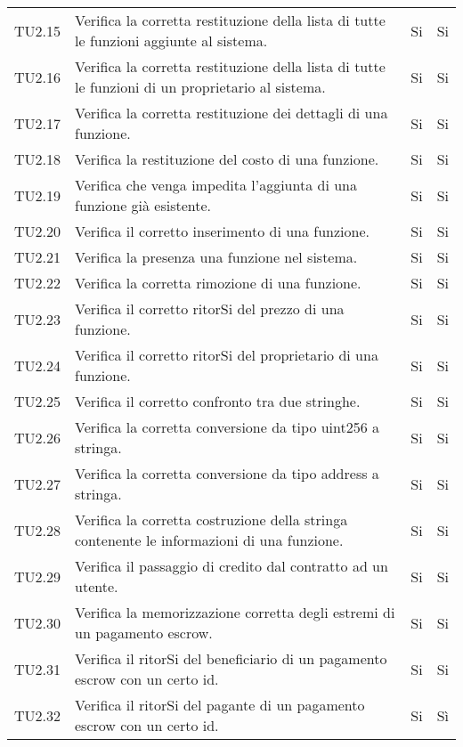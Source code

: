 \begin{longtable}{
		>{\centering}p{}
		>{}p{}
		>{\centering}p{}
		>{\centering}p{} }
TU2.15  &  Verifica la corretta restituzione della lista di tutte le funzioni aggiunte al sistema. &
Si & Si \tabularnewline

TU2.16  &  Verifica la corretta restituzione della lista di tutte le funzioni di un proprietario al sistema. &
Si & Si \tabularnewline

TU2.17  &  Verifica la corretta restituzione dei dettagli di una funzione. &
Si & Si \tabularnewline

TU2.18  &  Verifica la restituzione del costo di una funzione. &
Si & Si \tabularnewline

TU2.19  &  Verifica che venga impedita l'aggiunta di una funzione già esistente. &
Si & Si \tabularnewline

TU2.20  &  Verifica il corretto inserimento di una funzione. &%
Si & Si \tabularnewline

TU2.21  &  Verifica la presenza una funzione nel sistema.	&
Si & Si \tabularnewline

TU2.22  &  Verifica la corretta rimozione di una funzione. &
Si & Si \tabularnewline

TU2.23  &  Verifica il corretto ritorSi del prezzo di una funzione. &
Si & Si \tabularnewline

TU2.24  &  Verifica il corretto ritorSi del proprietario di una funzione. &
Si & Si \tabularnewline

TU2.25  &  Verifica il corretto confronto tra due stringhe. &
Si & Si \tabularnewline

TU2.26  &  Verifica la corretta conversione da tipo uint256 a stringa. &
Si & Si \tabularnewline

TU2.27  &  Verifica la corretta conversione da tipo address a stringa. &
Si & Si \tabularnewline

TU2.28  &  Verifica la corretta costruzione della stringa contenente le informazioni di una funzione. &
Si & Si \tabularnewline

TU2.29  &  Verifica il passaggio di credito dal contratto ad un utente. & %
Si & Si \tabularnewline

TU2.30  &  Verifica la memorizzazione corretta degli estremi di un pagamento escrow. &
Si & Si \tabularnewline

TU2.31  &  Verifica il ritorSi del beneficiario di un pagamento escrow con un certo id. &
Si & Si \tabularnewline

TU2.32  &  Verifica il ritorSi del pagante di un pagamento escrow con un certo id.  &
Si & Sì \tabularnewline


\end{longtable}
